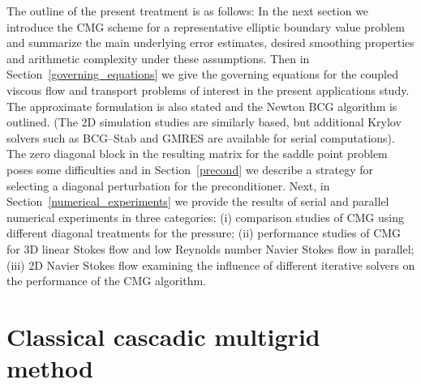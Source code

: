 The outline of the present treatment is as follows:  In the
next section we introduce the CMG scheme for a representative
elliptic boundary value problem and summarize the main underlying
error estimates, desired smoothing properties and arithmetic
complexity under these assumptions.  Then in Section~\ref{governing_equations}
we give the
governing equations for the coupled viscous flow and transport
problems of interest in the present applications study.  The
approximate formulation is also stated and the Newton BCG algorithm
is outlined.  (The 2D simulation studies are similarly based, but additional Krylov solvers such as
BCG--Stab and GMRES are available for serial computations). The zero diagonal
block in the resulting matrix for the saddle point problem poses some
difficulties and in Section~\ref{precond} we describe a strategy for selecting a
diagonal perturbation for the preconditioner.  Next, in
Section~\ref{numerical_experiments} we provide the results of serial and parallel numerical
experiments in three categories:  (i) comparison studies of CMG using
different diagonal treatments for the pressure;  (ii) performance
studies of CMG for 3D linear Stokes flow and low Reynolds number Navier
Stokes flow in parallel; (iii) 2D Navier Stokes flow examining the influence of different iterative solvers on the performance of the CMG algorithm.


\section{Classical cascadic multigrid method\label{cmg_theory}}

